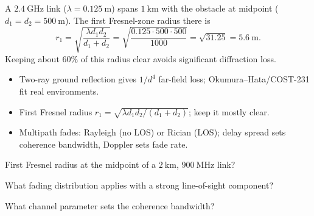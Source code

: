 \begin{workedexample}
A $2.4\ \text{GHz}$ link ($\lambda = 0.125\ \text{m}$) spans $1\ \text{km}$
with the obstacle at midpoint ($d_1 = d_2 = 500\ \text{m}$). The first Fresnel-zone
radius there is
\[ r_1 = \sqrt{\frac{\lambda d_1 d_2}{d_1+d_2}} = \sqrt{\frac{0.125\cdot500\cdot500}{1000}} = \sqrt{31.25} = 5.6\ \text{m}. \]
Keeping about $60\%$ of this radius clear avoids significant diffraction loss.
\end{workedexample}

\begin{keytakeaways}
\begin{itemize}[leftmargin=1.4em,itemsep=2pt]
\item Two-ray ground reflection gives $1/d^4$ far-field loss; Okumura--Hata/COST-231 fit real environments.
\item First Fresnel radius $r_1 = \sqrt{\lambda d_1 d_2/(d_1+d_2)}$; keep it mostly clear.
\item Multipath fades: Rayleigh (no LOS) or Rician (LOS); delay spread sets coherence bandwidth, Doppler sets fade rate.
\end{itemize}
\end{keytakeaways}

\begin{exercises}
\item First Fresnel radius at the midpoint of a $2\ \text{km}$, $900\ \text{MHz}$ link?
\item What fading distribution applies with a strong line-of-sight component?
\item What channel parameter sets the coherence bandwidth?
\end{exercises}

